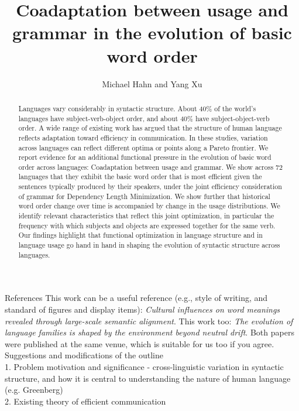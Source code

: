 \documentclass[11pt,a4paper]{article}
\title{Coadaptation between usage and grammar in the evolution of basic word order}
\author{Michael Hahn and Yang Xu}
\begin{document}
\maketitle


\begin{abstract}
Languages vary considerably in syntactic structure.
About 40\% of the world's languages have subject-verb-object order, and about 40\% have subject-object-verb order.
A wide range of existing work has argued that the structure of human language reflects adaptation toward efficiency in communication.
In these studies, variation across languages can reflect different optima or points along a Pareto frontier.
We report evidence for an additional functional pressure in the evolution of basic word order across languages:
Coadaptation between usage and grammar. We show across 72 languages that they exhibit the basic word order that is most efficient given the sentences typically produced by their speakers, under the joint efficiency consideration of grammar for Dependency Length Minimization.
We show further that historical word order change over time is accompanied by change in the usage distributions.
We identify relevant characteristics that reflect this joint optimization, in particular the frequency with which subjects and objects are expressed together for the same verb.
Our findings highlight that functional optimization in language structure and in language usage go hand in hand in shaping the evolution of syntactic structure across languages.
\end{abstract}

{\color{blue}References}
This work can be a useful reference (e.g., style of writing, and standard of figures and display items): {\it Cultural influences on word meanings revealed through large-scale semantic alignment}. This work too: {\it The evolution of language families is shaped by the environment beyond neutral drift}. Both papers were published at the same venue, which is suitable for us too if you agree.\\

{\color{blue}Suggestions and modifications of the outline}\\

{\color{blue}1. Problem motivation and significance - cross-linguistic variation in syntactic structure, and how it is central to understanding the nature of human language (e.g. Greenberg)}\\

{\color{blue}2. Existing theory of efficient communication}
\end{document}
